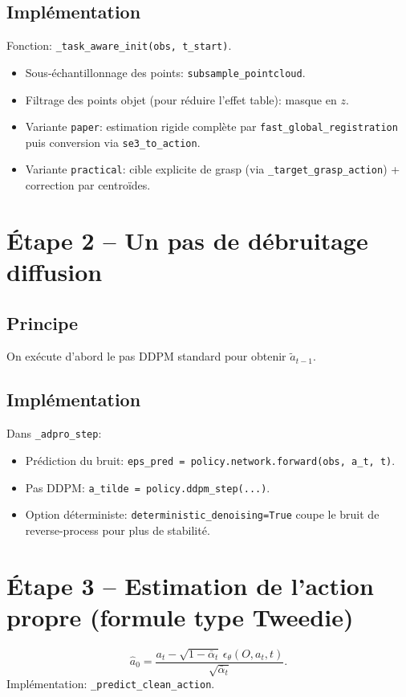 \documentclass[11pt,a4paper]{article}
\begin{document}
\subsection{Implémentation}
Fonction: \texttt{\_task\_aware\_init(obs, t\_start)}.
\begin{itemize}
\item Sous-échantillonnage des points: \texttt{subsample\_pointcloud}.
\item Filtrage des points objet (pour réduire l'effet table): masque en $z$.
\item Variante \texttt{paper}: estimation rigide complète par \texttt{fast\_global\_registration} puis conversion via \texttt{se3\_to\_action}.
\item Variante \texttt{practical}: cible explicite de grasp (via \texttt{\_target\_grasp\_action}) + correction par centroïdes.
\end{itemize}

\section{Étape 2 -- Un pas de débruitage diffusion}
\subsection{Principe}
On exécute d'abord le pas DDPM standard pour obtenir $\tilde a_{t-1}$.

\subsection{Implémentation}
Dans \texttt{\_adpro\_step}:
\begin{itemize}
\item Prédiction du bruit: \texttt{eps\_pred = policy.network.forward(obs, a\_t, t)}.
\item Pas DDPM: \texttt{a\_tilde = policy.ddpm\_step(...)}.
\item Option déterministe: \texttt{deterministic\_denoising=True} coupe le bruit de reverse-process pour plus de stabilité.
\end{itemize}

\section{Étape 3 -- Estimation de l'action propre (formule type Tweedie)}
\begin{equation}
\hat a_0 = \frac{a_t - \sqrt{1-\bar\alpha_t}\,\epsilon_\theta(O,a_t,t)}{\sqrt{\bar\alpha_t}}.
\end{equation}
Implémentation: \texttt{\_predict\_clean\_action}.
\end{document}
